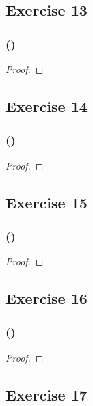 \documentclass[14pt]{extarticle}
\begin{document}
\subsection{Exercise 13}

\subsubsection{()}

\begin{proof}

\end{proof}

\subsection{Exercise 14}

\subsubsection{()}

\begin{proof}

\end{proof}

\subsection{Exercise 15}

\subsubsection{()}

\begin{proof}

\end{proof}

\subsection{Exercise 16}

\subsubsection{()}

\begin{proof}

\end{proof}

\subsection{Exercise 17}
\end{document}
